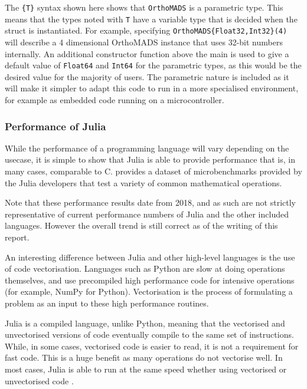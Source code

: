 The \texttt{\{T\}} syntax shown here shows that \texttt{OrthoMADS} is a parametric type. This means that the types noted with \texttt{T} have a variable type that is decided when the struct is instantiated. For example, specifying \texttt{OrthoMADS\{Float32,Int32\}(4)} will describe a 4 dimensional \ac{OrthoMADS} instance that uses 32-bit numbers internally. An additional constructor function above the main is used to give a default value of \texttt{Float64} and \texttt{Int64} for the parametric types, as this would be the desired value for the majority of users. The parametric nature is included as it will make it simpler to adapt this code to run in a more specialised environment, for example as embedded code running on a microcontroller.



\subsubsection{Performance of Julia}
While the performance of a programming language will vary depending on the usecase, it is simple to show that Julia is able to provide performance that is, in many cases, comparable to C. \cite{JuliaMicrobenchmarks} provides a dataset of microbenchmarks provided by the Julia developers that test a variety of common mathematical operations. 

Note that these performance results date from 2018, and as such are not strictly representative of current performance numbers of Julia and the other included languages. However the overall trend is still correct as of the writing of this report.

An interesting difference between Julia and other high-level languages is the use of code vectorisation. Languages such as Python are slow at doing operations themselves, and use precompiled high performance code for intensive operations (for example, NumPy for Python). Vectorisation is the process of formulating a problem as an input to these high performance routines. 

Julia is a compiled language, unlike Python, meaning that the vectorised and unvectorised versions of code eventually compile to the same set of instructions. While, in some cases, vectorised code is easier to read, it is not a requirement for fast code. This is a huge benefit as many operations do not vectorise well. In most cases, Julia is able to run at the same speed whether using vectorised or unvectorised code \cite{Bezanson2017Julia:Computing}.

